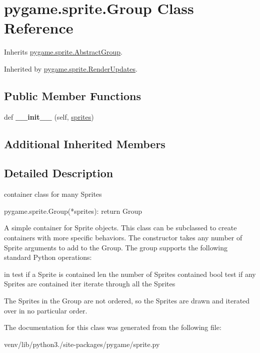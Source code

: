 \hypertarget{classpygame_1_1sprite_1_1_group}{}\section{pygame.\+sprite.\+Group Class Reference}
\label{classpygame_1_1sprite_1_1_group}


Inherits \hyperlink{classpygame_1_1sprite_1_1_abstract_group}{pygame.\+sprite.\+Abstract\+Group}.



Inherited by \hyperlink{classpygame_1_1sprite_1_1_render_updates}{pygame.\+sprite.\+Render\+Updates}.

\subsection*{Public Member Functions}
\begin{DoxyCompactItemize}
\item 
\mbox{\label{classpygame_1_1sprite_1_1_group_abf7b1489919b02e7749e67d08a31aa94}} 
def {\bfseries \+\_\+\+\_\+init\+\_\+\+\_\+} (self, \hyperlink{classpygame_1_1sprite_1_1_abstract_group_a914ae9cbf2b6f8afc7b79dcb5e9c3b37}{sprites})
\end{DoxyCompactItemize}
\subsection*{Additional Inherited Members}


\subsection{Detailed Description}
\begin{DoxyVerb}container class for many Sprites

pygame.sprite.Group(*sprites): return Group

A simple container for Sprite objects. This class can be subclassed to
create containers with more specific behaviors. The constructor takes any
number of Sprite arguments to add to the Group. The group supports the
following standard Python operations:

    in      test if a Sprite is contained
    len     the number of Sprites contained
    bool    test if any Sprites are contained
    iter    iterate through all the Sprites

The Sprites in the Group are not ordered, so the Sprites are drawn and
iterated over in no particular order.\end{DoxyVerb}
 

The documentation for this class was generated from the following file\+:\begin{DoxyCompactItemize}
\item 
venv/lib/python3./site-\/packages/pygame/sprite.\+py\end{DoxyCompactItemize}
